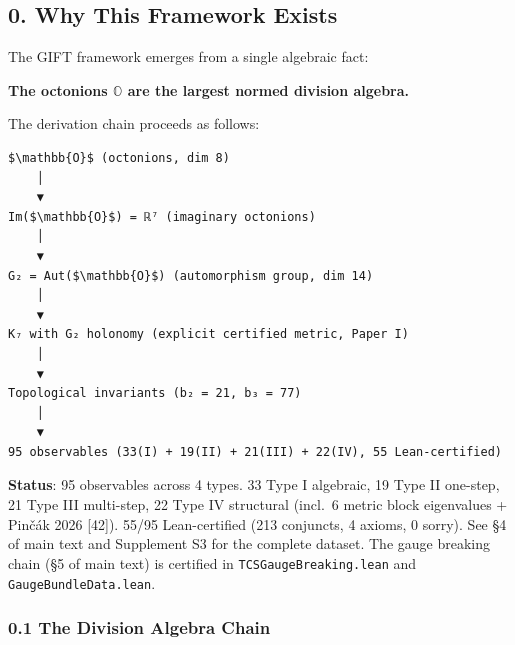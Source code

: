 \documentclass[11pt,a4paper]{article}
\begin{document}
\subsection{0. Why This Framework Exists}\label{why-this-framework-exists}

The GIFT framework emerges from a single algebraic fact:

\textbf{The octonions $\mathbb{O}$ are the largest normed division algebra.}

The derivation chain proceeds as follows:

\begin{verbatim}
$\mathbb{O}$ (octonions, dim 8)
    │
    ▼
Im($\mathbb{O}$) = ℝ⁷ (imaginary octonions)
    │
    ▼
G₂ = Aut($\mathbb{O}$) (automorphism group, dim 14)
    │
    ▼
K₇ with G₂ holonomy (explicit certified metric, Paper I)
    │
    ▼
Topological invariants (b₂ = 21, b₃ = 77)
    │
    ▼
95 observables (33(I) + 19(II) + 21(III) + 22(IV), 55 Lean-certified)
\end{verbatim}

\textbf{Status}: 95 observables across 4 types. 33 Type I algebraic, 19 Type II one-step, 21 Type III multi-step, 22 Type IV structural (incl.~6 metric block eigenvalues + Pinčák 2026 [42]). 55/95 Lean-certified (213 conjuncts, 4 axioms, 0 sorry). See §4 of main text and Supplement S3 for the complete dataset. The gauge breaking chain (§5 of main text) is certified in \texttt{TCSGaugeBreaking.lean} and \texttt{GaugeBundleData.lean}.

\subsubsection{0.1 The Division Algebra Chain}\label{the-division-algebra-chain}
\end{document}
